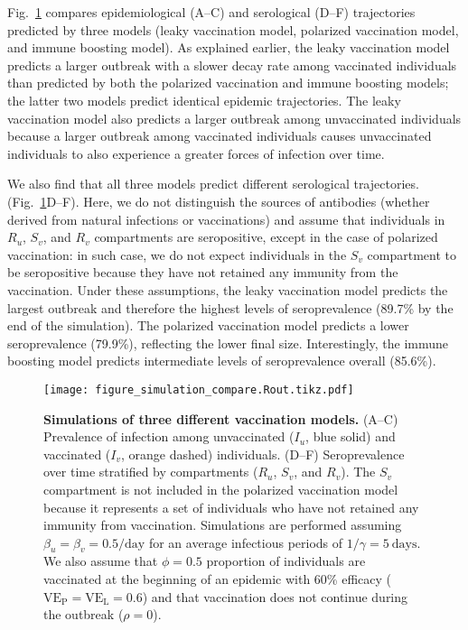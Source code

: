 \documentclass[12pt]{article}
\newcommand{\fref}[1]{Fig.~\ref{fig:#1}}
\newcommand{\VE}{\ensuremath{\mathrm{VE}}}
\newcommand{\VEP}{\ensuremath{\VE_{\mathrm{P}}}}
\newcommand{\VEL}{\ensuremath{\VE_{\mathrm{L}}}}
\begin{document}
\fref{simulation} compares epidemiological (A--C) and serological (D--F) trajectories predicted by three models (leaky vaccination model, polarized vaccination model, and immune boosting model).
As explained earlier, the leaky vaccination model predicts a larger outbreak with a slower decay rate among vaccinated individuals than predicted by both the polarized vaccination and immune boosting models;
the latter two models predict identical epidemic trajectories.
The leaky vaccination model also predicts a larger outbreak among unvaccinated individuals because a larger outbreak among vaccinated individuals causes unvaccinated individuals to also experience a greater forces of infection over time.

We also find that all three models predict different serological trajectories. (\fref{simulation}D--F). 
Here, we do not distinguish the sources of antibodies (whether derived from natural infections or vaccinations) and assume that individuals in $R_u$, $S_v$, and $R_v$ compartments are seropositive, except in the case of polarized vaccination:
in such case, we do not expect individuals in the $S_v$ compartment to be seropositive because they have not retained any immunity from the vaccination.
Under these assumptions, the leaky vaccination model predicts the largest outbreak and therefore the highest levels of seroprevalence (89.7\% by the end of the simulation).
The polarized vaccination model predicts a lower seroprevalence (79.9\%), reflecting the lower final size.
Interestingly, the immune boosting model predicts intermediate levels of seroprevalence overall (85.6\%).

\begin{figure}[!th]
\texttt{[image: figure\_simulation\_compare.Rout.tikz.pdf]}
\caption{
\textbf{Simulations of three different vaccination models.}
(A--C) Prevalence of infection among unvaccinated ($I_u$, blue solid) and vaccinated ($I_v$, orange dashed) individuals.
(D--F) Seroprevalence over time stratified by compartments ($R_u$, $S_v$, and $R_v$).
The $S_v$ compartment is not included in the polarized vaccination model because it represents a set of individuals who have not retained any immunity from vaccination.
Simulations are performed assuming $\beta_u = \beta_v =0.5/\mathrm{day}$ for an average infectious periods of $1/\gamma=5~\mathrm{days}$.
We also assume that $\phi = 0.5$ proportion of individuals are vaccinated at the beginning of an epidemic with 60\% efficacy ($\VEP=\VEL=0.6$) and that vaccination does not continue during the outbreak ($\rho = 0$).
\label{fig:simulation}
}
\end{figure}
\end{document}

